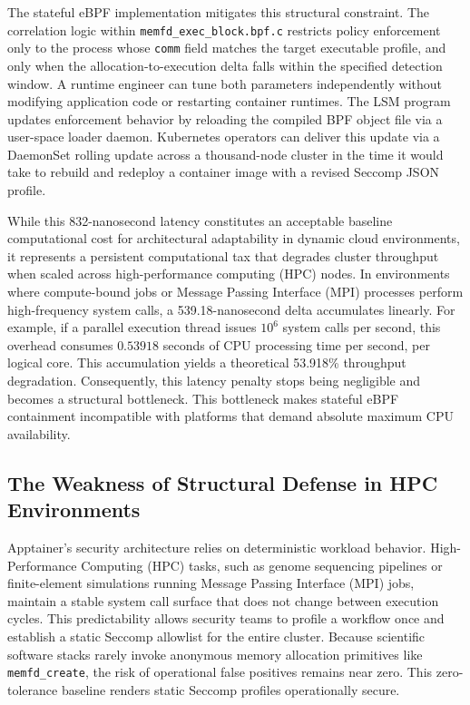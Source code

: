 The stateful eBPF implementation mitigates this structural constraint. The correlation logic within \texttt{memfd\_exec\_block.bpf.c} restricts policy enforcement only to the process whose \texttt{comm} field matches the target executable profile, and only when the allocation-to-execution delta falls within the specified detection window. A runtime engineer can tune both parameters independently without modifying application code or restarting container runtimes. The LSM program updates enforcement behavior by reloading the compiled BPF object file via a user-space loader daemon. Kubernetes operators can deliver this update via a DaemonSet rolling update across a thousand-node cluster in the time it would take to rebuild and redeploy a container image with a revised Seccomp JSON profile.

While this 832-nanosecond latency constitutes an acceptable baseline computational cost for architectural adaptability in dynamic cloud environments, it represents a persistent computational tax that degrades cluster throughput when scaled across high-performance computing (HPC) nodes. In environments where compute-bound jobs or Message Passing Interface (MPI) processes perform high-frequency system calls, a 539.18-nanosecond delta accumulates linearly. For example, if a parallel execution thread issues $10^6$ system calls per second, this overhead consumes $0.53918$ seconds of CPU processing time per second, per logical core. This accumulation yields a theoretical 53.918\% throughput degradation. Consequently, this latency penalty stops being negligible and becomes a structural bottleneck. This bottleneck makes stateful eBPF containment incompatible with platforms that demand absolute maximum CPU availability.

\subsection{The Weakness of Structural Defense in HPC Environments}
\label{sec:weakness_structural_defense}

Apptainer's security architecture relies on deterministic workload behavior. High-Performance Computing (HPC) tasks, such as genome sequencing pipelines or finite-element simulations running Message Passing Interface (MPI) jobs, maintain a stable system call surface that does not change between execution cycles. This predictability allows security teams to profile a workflow once and establish a static Seccomp allowlist for the entire cluster. Because scientific software stacks rarely invoke anonymous memory allocation primitives like \texttt{memfd\_create}, the risk of operational false positives remains near zero. This zero-tolerance baseline renders static Seccomp profiles operationally secure.

